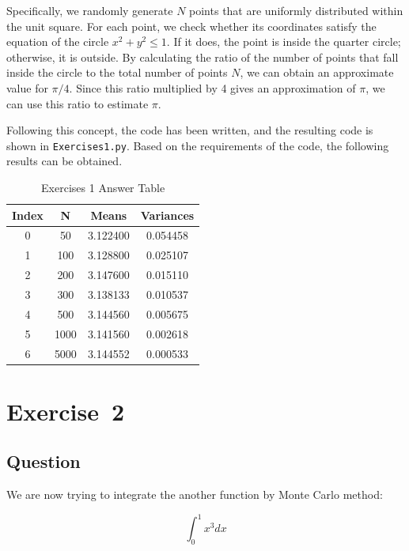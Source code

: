 \documentclass[a4paper, utf8]{ctexart}
\begin{document}
	Specifically, we randomly generate $N$ points that are uniformly distributed within the unit square. For each point, we check whether its coordinates satisfy the equation of the circle $x^2 + y^2 \leq 1$. If it does, the point is inside the quarter circle; otherwise, it is outside. By calculating the ratio of the number of points that fall inside the circle to the total number of points $N$, we can obtain an approximate value for $\pi/4$. Since this ratio multiplied by 4 gives an approximation of $\pi$, we can use this ratio to estimate $\pi$.
	
	Following this concept, the code has been written, and the resulting code is shown in \verb|Exercises1.py|. Based on the requirements of the code, the following results can be obtained.
	
	\begin{table}[http]
		\begin{center}
			\caption{Exercises 1 Answer Table}
			\begin{tabular}{c c c c}
				\hline
				Index & N & Means & Variances \\
				\hline
				0 &   50 & 3.122400 & 0.054458 \\
				1 &  100 & 3.128800 & 0.025107 \\
				2 &  200 & 3.147600 & 0.015110 \\
				3 &  300 & 3.138133 & 0.010537 \\
				4 &  500 & 3.144560 & 0.005675 \\
				5 & 1000 & 3.141560 & 0.002618 \\
				6 & 5000 & 3.144552 & 0.000533 \\
				\hline
			\end{tabular}
		\end{center}
	\end{table}
	
	\section{Exercise\ 2}
	
	\subsection{Question}
	
	We are now trying to integrate the another function by Monte Carlo method:
	
	\begin{equation}
		\int_{0}^{1}x^3 dx
		\nonumber
	\end{equation}
	
\end{document}
